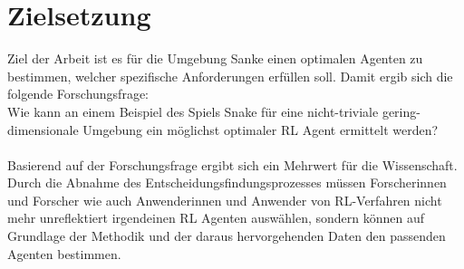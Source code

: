 \section{Zielsetzung}
Ziel der Arbeit ist es für die Umgebung Sanke einen optimalen Agenten zu bestimmen, welcher spezifische Anforderungen erfüllen soll.
Damit ergib sich die folgende Forschungsfrage:\\
Wie kann an einem Beispiel des Spiels Snake für eine nicht-triviale gering-dimensionale Umgebung ein möglichst optimaler RL Agent ermittelt werden?\\
\\Basierend auf der Forschungsfrage ergibt sich ein Mehrwert für die Wissenschaft. Durch die Abnahme des Entscheidungsfindungsprozesses müssen Forscherinnen und Forscher wie auch Anwenderinnen und Anwender von RL-Verfahren nicht mehr unreflektiert irgendeinen RL Agenten auswählen, sondern können auf Grundlage der Methodik und der daraus hervorgehenden Daten den passenden Agenten bestimmen.

